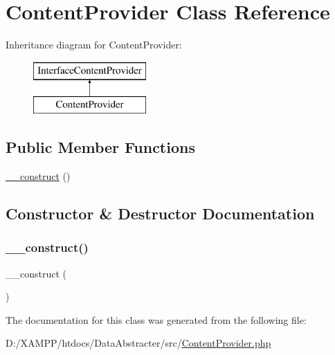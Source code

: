 \hypertarget{class_david_fricker_1_1_data_abstracter_1_1_content_provider}{}\section{Content\+Provider Class Reference}
\label{class_david_fricker_1_1_data_abstracter_1_1_content_provider}
Inheritance diagram for Content\+Provider\+:\begin{figure}[H]
\begin{center}
\leavevmode
\includegraphics[height=2.000000cm]{class_david_fricker_1_1_data_abstracter_1_1_content_provider}
\end{center}
\end{figure}
\subsection*{Public Member Functions}
\begin{DoxyCompactItemize}
\item 
\hyperlink{class_david_fricker_1_1_data_abstracter_1_1_content_provider_a095c5d389db211932136b53f25f39685}{\+\_\+\+\_\+construct} ()
\end{DoxyCompactItemize}


\subsection{Constructor \& Destructor Documentation}
\mbox{\label{class_david_fricker_1_1_data_abstracter_1_1_content_provider_a095c5d389db211932136b53f25f39685}} 
\subsubsection{\texorpdfstring{\+\_\+\+\_\+construct()}{\_\_construct()}}
{\footnotesize\ttfamily \+\_\+\+\_\+construct (\begin{DoxyParamCaption}{ }\end{DoxyParamCaption})}



The documentation for this class was generated from the following file\+:\begin{DoxyCompactItemize}
\item 
D\+:/\+X\+A\+M\+P\+P/htdocs/\+Data\+Abstracter/src/\hyperlink{_content_provider_8php}{Content\+Provider.\+php}\end{DoxyCompactItemize}
